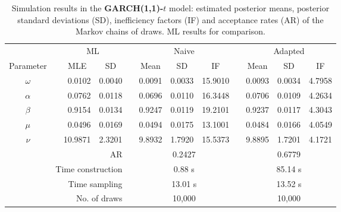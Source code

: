 { \renewcommand{\arraystretch}{1.3} 
\begin{table}[h] 
\centering 
\caption{Simulation results in the \textbf{GARCH(1,1)-$t$} model: estimated posterior means, posterior standard deviations (SD), inefficiency factors (IF) and acceptance rates (AR) of the Markov chains of draws. ML results for comparison.} 
\label{tab:posterior_t_garch2_noS} 
\begin{tabular}{cc rr c rrr c rrr}  
 & & \multicolumn{2}{c}{ML} & & \multicolumn{3}{c}{Naive} & & \multicolumn{3}{c}{Adapted} \\  \cline{3-4} \cline{6-8} \cline{10-12} 
 Parameter & &  \multicolumn{1}{c}{MLE} &  \multicolumn{1}{c}{SD}  & &  \multicolumn{1}{c}{Mean} &  \multicolumn{1}{c}{SD} &  \multicolumn{1}{c}{IF} & &  \multicolumn{1}{c}{Mean} &  \multicolumn{1}{c}{SD} &  \multicolumn{1}{c}{IF} \\ \cline{1-1}  \cline{3-4} \cline{6-8} \cline{10-12}  
$\omega$ & & 0.0102 &  0.0040 & & 0.0091 &  0.0033 & 15.9010 & & 0.0093 &  0.0034 &  4.7958 \\ [1ex] 
$\alpha$ & & 0.0762 &  0.0118 & & 0.0696 &  0.0110 & 16.3448 & & 0.0706 &  0.0109 &  4.2634 \\ [1ex] 
$\beta$ & & 0.9154 &  0.0134 & & 0.9247 &  0.0119 & 19.2101 & & 0.9237 &  0.0117 &  4.3043 \\ [1ex] 
$\mu$ & & 0.0496 &  0.0169 & & 0.0494 &  0.0175 & 13.1001 & & 0.0484 &  0.0166 &  4.0549 \\ [1ex] 
$\nu$ & &10.9871 &  2.3201 & & 9.8932 &  1.7920 & 15.5373 & & 9.8895 &  1.7201 &  4.1721 \\ [1ex] 
\cline{1-1}  \cline{3-4} \cline{6-8} \cline{10-12}   
\multicolumn{4}{r}{AR} & &\multicolumn{3}{c}{0.2427} &&\multicolumn{3}{c}{0.6779} \\ 
  \cline{1-4} \cline{6-8} \cline{10-12}  
 \multicolumn{4}{r}{Time construction} & &\multicolumn{3}{c}{0.88 s} &&\multicolumn{3}{c}{85.14 s} \\ 
   \multicolumn{4}{r}{Time sampling} & &\multicolumn{3}{c}{13.01 s} &&\multicolumn{3}{c}{13.52 s} \\ 
   \multicolumn{4}{r}{No. of draws }& &\multicolumn{3}{c}{10,000} &&\multicolumn{3}{c}{10,000} \\ 
  \cline{1-4} \cline{6-8} \cline{10-12} 
\hline 
\end{tabular} 
\end{table} 
} 
